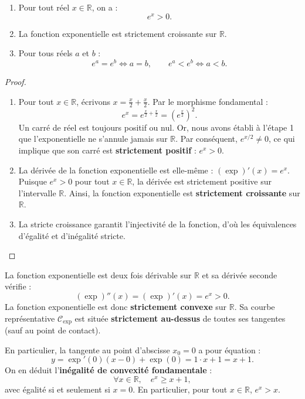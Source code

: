 \documentclass[11pt,a4paper]{article}
\newcommand{\R}{\mathbb{R}}
\begin{document}
\begin{theoremebox}
\begin{enumerate}
    \item Pour tout réel $x \in \R$, on a :
    \[
    e^x > 0.
    \]
    \item La fonction exponentielle est strictement croissante sur $\R$.
    \item Pour tous réels $a$ et $b$ :
    \[
    e^a = e^b \iff a = b, \qquad e^a < e^b \iff a < b.
    \]
\end{enumerate}
\end{theoremebox}

\begin{proof}
\begin{enumerate}
    \item Pour tout $x \in \R$, écrivons $x = \frac{x}{2} + \frac{x}{2}$. Par le morphisme fondamental :
    \[
    e^x = e^{\frac{x}{2} + \frac{x}{2}} = \left(e^{\frac{x}{2}}\right)^2.
    \]
    Un carré de réel est toujours positif ou nul. Or, nous avons établi à l'étape 1 que l'exponentielle ne s'annule jamais sur $\R$. Par conséquent, $e^{x/2} \neq 0$, ce qui implique que son carré est \textbf{strictement positif} : $e^x > 0$.
    \item La dérivée de la fonction exponentielle est elle-même : $(\exp)'(x) = e^x$. Puisque $e^x > 0$ pour tout $x \in \R$, la dérivée est strictement positive sur l'intervalle $\R$. Ainsi, la fonction exponentielle est \textbf{strictement croissante} sur $\R$.
    \item La stricte croissance garantit l'injectivité de la fonction, d'où les équivalences d'égalité et d'inégalité stricte.
\end{enumerate}
\end{proof}

\begin{theoremebox}
La fonction exponentielle est deux fois dérivable sur $\R$ et sa dérivée seconde vérifie :
\[
(\exp)''(x) = (\exp)'(x) = e^x > 0.
\]
La fonction exponentielle est donc \textbf{strictement convexe} sur $\R$. Sa courbe représentative $\mathcal{C}_{\exp}$ est située \textbf{strictement au-dessus} de toutes ses tangentes (sauf au point de contact).

En particulier, la tangente au point d'abscisse $x_0 = 0$ a pour équation :
\[
y = \exp'(0)(x - 0) + \exp(0) = 1 \cdot x + 1 = x + 1.
\]
On en déduit l'\textbf{inégalité de convexité fondamentale} :
\[
\forall x \in \R, \quad e^x \ge x + 1,
\]
avec égalité si et seulement si $x = 0$. En particulier, pour tout $x \in \R$, $e^x > x$.
\end{theoremebox}
\end{document}
